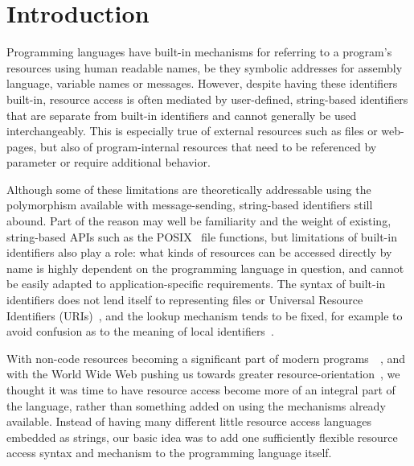 \documentclass[preprint]{sigplanconf}
\begin{document}



\section{Introduction}




Programming languages have built-in mechanisms for 
referring to a program's resources using human readable names, be they symbolic addresses for
assembly language, variable names or messages.   However, despite having these identifiers built-in, resource access
is often mediated by user-defined, string-based identifiers that are separate from built-in identifiers
and cannot generally be used interchangeably.  This is especially true
of external resources such as files or web-pages, but also of program-internal resources that need to
be referenced by parameter or require additional behavior.



Although some of these limitations are theoretically addressable using the polymorphism available with
message-sending, string-based identifiers still abound.
Part of the reason may well be familiarity and the weight of existing, string-based APIs such as the POSIX~\cite{IEEE:POSIX.1-90}
file functions, but
limitations of built-in identifiers also play a role:   what kinds of resources can be accessed directly by name is
highly dependent on the programming language in question, and cannot be easily 
adapted to application-specific requirements.  The syntax of built-in identifiers does not lend itself to representing
files or Universal Resource Identifiers (URIs)~\cite{rfc3986}, and the lookup mechanism tends to be fixed, for example to avoid confusion as to the
meaning of local identifiers~\cite{gabriel-lisp-identifiers}.

With non-code resources becoming a significant part of modern programs~\cite{android-resources}~\cite{ios-resources}, 
and with the World Wide Web pushing us towards greater resource-orientation~\cite{fielding-rest}, we thought it was
time to have resource access become more of an integral part of the language, rather than something added on using
the mechanisms already available.
  Instead of having many different little resource
access languages embedded as strings, our basic idea was to add one sufficiently flexible resource access syntax and
mechanism to the programming language itself.
\end{document}
